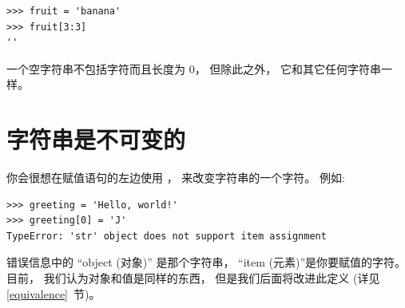 \begin{lstlisting}
>>> fruit = 'banana'
>>> fruit[3:3]
''
\end{lstlisting}

%

一个空字符串不包括字符而且长度为 0， 但除此之外， 它和其它任何字符串一样。

  
  

\section{字符串是不可变的}
    
    


你会很想在赋值语句的左边使用 \li{[]}， 来改变字符串的一个字符。  例如:
  

\begin{lstlisting}
>>> greeting = 'Hello, world!'
>>> greeting[0] = 'J'
TypeError: 'str' object does not support item assignment
\end{lstlisting}

%
    
  
    
  



错误信息中的 ``object (对象)'' 是那个字符串， ``item (元素)''是你要赋值的字符。  目前， 我们认为对象和值是同样的东西， 但是我们后面将改进此定义 (详见 \ref{equivalence}~节)。

